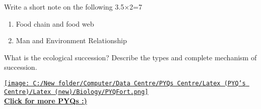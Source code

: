 \documentclass[12pt,a4paper]{article}
\begin{document}
\begin{questions}
    \vspace{\baselineskip}
    
    \item Write a short note on the following \hfill 3.5×2=7
    \begin{enumerate}[label=(\roman*), leftmargin=2em]
    \item Food chain and food web
    \item Man and Environment Relationship
    \end{enumerate}

    \vspace{\baselineskip}
    
    \item What is the ecological succession? Describe the types and complete mechanism of succession.

\end{questions}

\vspace{2\baselineskip}

\begin{center}
    \href{https://github.com/Saumy1905/PYQFort}{%
        \texttt{[image: C:/New folder/Computer/Data Centre/PYQs Centre/Latex (PYQ's Centre)/Latex (new)/Biology/PYQFort.png]} \\
        \vspace{0.5em}
        \textbf{Click for more PYQs :)}
    }
\end{center}
\end{document}
